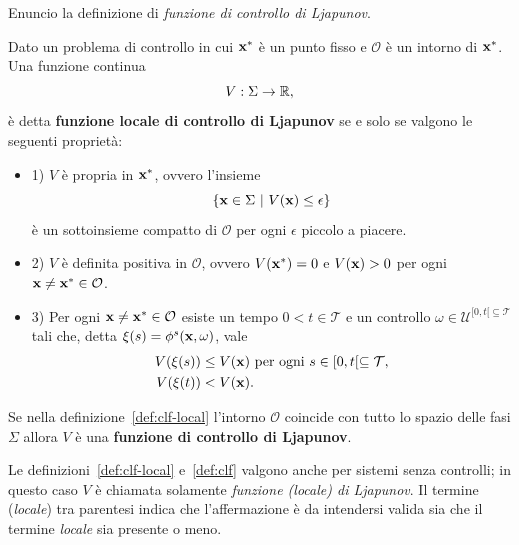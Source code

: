 Enuncio la definizione di \emph{funzione di controllo di Ljapunov}.
\begin{definition}
    \label{def:clf-local}
    Dato un problema di controllo in cui $\mathbf{x}^*$ è un punto fisso e
    $\mathcal O$ è un intorno di $\mathbf{x}^*$.
    Una funzione continua
    \begin{equation*}
        V : \Sigma \to \mathbb{R},
    \end{equation*}
    è detta \textbf{funzione locale di controllo di Ljapunov} se
    e solo se valgono le seguenti proprietà:

    \begin{itemize}
        \item 1) $V$ è propria in $\mathbf{x}^*$, ovvero l'insieme
        \begin{equation*}
            \left\{\mathbf{x} \in \Sigma\ |\ V(\mathbf{x}) \leq \epsilon \right\}
        \end{equation*}
        è un sottoinsieme compatto di $\mathcal O$ per ogni $\epsilon$ piccolo a piacere.
        \item 2) $V$ è definita positiva in $\mathcal O$, ovvero $V(\mathbf{x}^*) = 0$ e
        $V(\mathbf{x}) > 0$ per ogni $\mathbf{x} \neq \mathbf{x}^* \in \mathcal O$.
        \item 3) Per ogni $\mathbf{x} \neq \mathbf{x}^* \in \mathcal O$
        esiste un tempo $0 < t \in \mathcal T$ e un controllo $\omega \in \mathcal U^{[0,t[ \subseteq \mathcal T}$
        tali che, detta $\xi(s) = \phi^s(\mathbf{x}, \omega)$, vale
        \begin{align*}
            V(\xi(s)) &\leq V(\mathbf{x}) \text{ per ogni } s \in [0,t[ \subseteq \mathcal T, \\
            V(\xi(t)) &< V(\mathbf{x}).
        \end{align*}
    \end{itemize}
\end{definition}

\begin{definition}
    Se nella definizione~\ref{def:clf-local} l'intorno $\mathcal O$ coincide
    con tutto lo spazio delle fasi $\Sigma$ allora $V$ è una
    \textbf{funzione di controllo di Ljapunov}.
    \label{def:clf}
\end{definition}

Le definizioni~\ref{def:clf-local} e~\ref{def:clf} valgono anche per sistemi
senza controlli; in questo caso $V$ è chiamata solamente \emph{funzione (locale) di Ljapunov}.
Il termine (\emph{locale}) tra parentesi indica che l'affermazione è da intendersi valida
sia che il termine \emph{locale} sia presente o meno.

